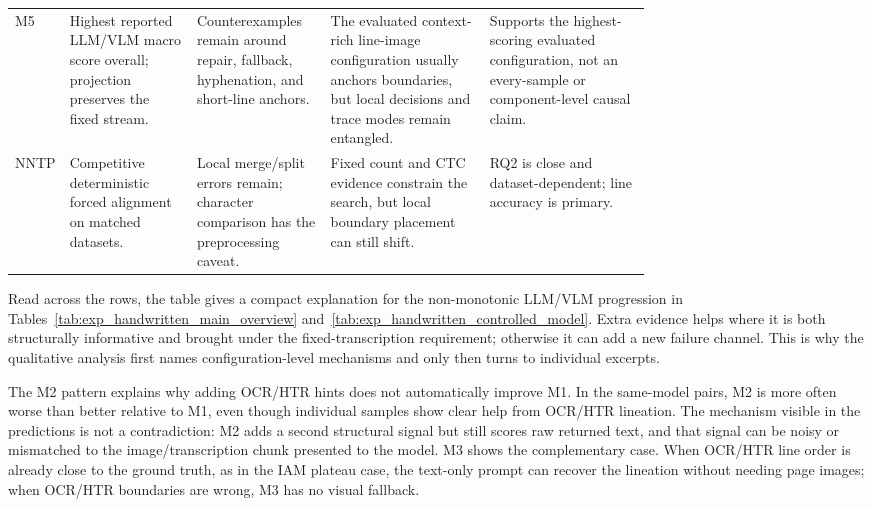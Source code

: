 \begin{table}[!htbp]
\begin{tabularx}{\linewidth}{@{}>{\raggedright\arraybackslash}p{0.075\linewidth}>{\raggedright\arraybackslash}p{0.20\linewidth}>{\raggedright\arraybackslash}p{0.21\linewidth}>{\raggedright\arraybackslash}p{0.25\linewidth}Y@{}}
    \addlinespace[0.35em]
    M5 & Highest reported LLM/VLM macro score overall; projection preserves the fixed stream. & Counterexamples remain around repair, fallback, hyphenation, and short-line anchors. & The evaluated context-rich line-image configuration usually anchors boundaries, but local decisions and trace modes remain entangled. & Supports the highest-scoring evaluated configuration, not an every-sample or component-level causal claim. \\
    \addlinespace[0.35em]
    NNTP & Competitive deterministic forced alignment on matched datasets. & Local merge/split errors remain; character comparison has the preprocessing caveat. & Fixed count and CTC evidence constrain the search, but local boundary placement can still shift. & RQ2 is close and dataset-dependent; line accuracy is primary. \\
    \bottomrule
  \end{tabularx}
\end{table}

Read across the rows, the table gives a compact explanation for the non-monotonic LLM/VLM progression in Tables~\ref{tab:exp_handwritten_main_overview} and~\ref{tab:exp_handwritten_controlled_model}. Extra evidence helps where it is both structurally informative and brought under the fixed-transcription requirement; otherwise it can add a new failure channel. This is why the qualitative analysis first names configuration-level mechanisms and only then turns to individual excerpts.

The M2 pattern explains why adding OCR/HTR hints does not automatically improve M1. In the same-model pairs, M2 is more often worse than better relative to M1, even though individual samples show clear help from OCR/HTR lineation. The mechanism visible in the predictions is not a contradiction: M2 adds a second structural signal but still scores raw returned text, and that signal can be noisy or mismatched to the image/transcription chunk presented to the model. M3 shows the complementary case. When OCR/HTR line order is already close to the ground truth, as in the IAM plateau case, the text-only prompt can recover the lineation without needing page images; when OCR/HTR boundaries are wrong, M3 has no visual fallback.

